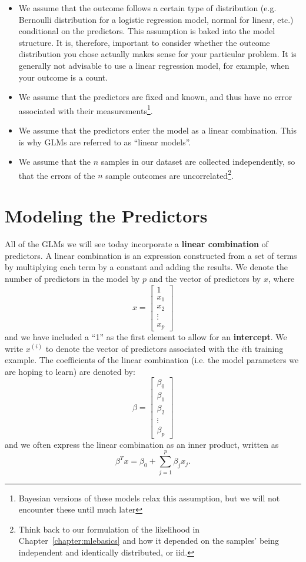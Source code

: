\begin{itemize}
\item We assume that the outcome follows a certain type of distribution (e.g. Bernoulli distribution for a logistic regression model, normal for linear, etc.) conditional on the predictors. This assumption is baked into the model structure. It is, therefore, important to consider whether the outcome distribution you chose actually makes sense for your particular problem. It is generally not advisable to use a linear regression model, for example, when your outcome is a count. 
\item We assume that the predictors are fixed and known, and thus have no error associated with their measurements\footnote{Bayesian versions of these models relax this assumption, but we will not encounter these until much later}.
\item We assume that the predictors enter the model as a linear combination. This is why GLMs are referred to as ``linear models''. 
\item We assume that the $n$ samples in our dataset are collected independently, so that the errors of the $n$ sample outcomes are uncorrelated\footnote{Think back to our formulation of the likelihood in Chapter~\ref{chapter:mlebasics} and how it depended on the samples' being independent and identically distributed, or iid.}.
\end{itemize}


\section{Modeling the Predictors}

All of the GLMs we will see today incorporate a \textbf{linear combination} of predictors. A linear combination is an expression constructed from a set of terms by multiplying each term by a constant and adding the results. We denote the number of predictors in the model by $p$ and the vector of predictors by $x$, where
$$ x = \begin{bmatrix}
1 \\
           x_{1} \\
           x_{2} \\
           \vdots \\
           x_{p}
         \end{bmatrix} $$
and we have included a ``1'' as the first element to allow for an \textbf{intercept}. We write $x^{(i)}$ to denote the vector of predictors associated with the $i$th training example. The coefficients of the linear combination (i.e. the model parameters we are hoping to learn) are denoted by:
$$ \beta = \begin{bmatrix}
\beta_0 \\
           \beta_{1} \\
           \beta_{2} \\
           \vdots \\
           \beta_{p}
         \end{bmatrix} $$
and we often express the linear combination as an inner product, written as
$$ \beta^T x = \beta_0 + \sum_{j=1}^p \beta_j x_j. $$

